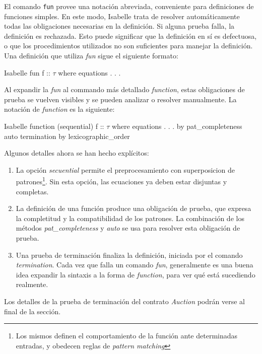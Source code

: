 \documentclass[12pt]{book}
\begin{document}
El comando \texttt{fun} provee una notación abreviada, conveniente para definiciones de funciones simples. En este modo, Isabelle trata de resolver automáticamente todas las obligaciones necesarias en la definición. Si alguna prueba falla, la definición es rechazada. Esto puede significar que la definición en sí es defectuosa, o que los procedimientos utilizados no son suficientes para manejar la definición. Una definición que utiliza \textit{fun} sigue el siguiente formato:

\begin{code}[title=Definición de una función mediante \textit{fun}]{Isabelle}
fun f :: $\tau$
where
    equations
    .
    .
    .
\end{code}

Al expandir la \textit{fun} al commando más detallado \textit{function}, estas obligaciones de prueba se vuelven visibles y se pueden analizar o resolver manualmente. La notación de \textit{function} es la siguiente:

\begin{code}[title=Definición de una función mediante \textit{function}]{Isabelle}
function (sequential) f :: $\tau$
where
    equations
    .
    .
    .
by pat_completeness auto
termination by lexicographic_order
\end{code}

Algunos detalles ahora se han hecho explícitos:
\begin{enumerate}
    \item La opción \textit{secuential} permite el preprocesamiento con superposicion de patrones\footnote{Los mismos definen el comportamiento de la función ante determinadas entradas, y obedecen reglas de \textit{pattern matching}}. Sin esta opción, las ecuaciones ya deben estar disjuntas y completas.
    \item La definición de una función produce una obligación de prueba, que expresa la completitud y la compatibilidad de los patrones. La combinación de los métodos \textit{pat\_completeness} y \textit{auto} se usa para resolver esta obligación de prueba.
    \item Una prueba de terminación finaliza la definición, iniciada por el comando \textit{termination}. Cada vez que falla un comando \textit{fun}, generalmente es una buena idea expandir la sintaxis a la forma de \textit{function}, para ver qué está sucediendo realmente.
\end{enumerate}

Los detalles de la prueba de terminación del contrato \textit{Auction} podrán verse al final de la sección.
\end{document}
